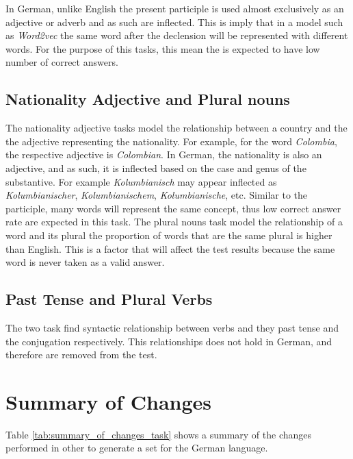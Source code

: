 In German, unlike English  the present participle is used almost exclusively as an
adjective or adverb and as such are inflected. This is imply that in a model
such as  \textit{Word2vec} the same word after the declension will be
represented with different words. For the purpose of this tasks, this mean
the is expected to have low number of correct answers.

\subsection{Nationality Adjective and  Plural nouns}
\label{sec:sub_sec_nat_plu}

The nationality adjective tasks model the relationship between a country and
the the adjective representing the nationality. For example, for the word
\textit{Colombia}, the respective adjective is \textit{Colombian}. In German,
the nationality is also an adjective, and as such, it  is inflected based on the
case and genus of the substantive.  For example  \textit{Kolumbianisch} may appear 
inflected as \textit{Kolumbianischer},  \textit{Kolumbianischem},
\textit{Kolumbianische}, etc.  Similar to the participle, many words will
represent the same concept, thus low correct answer rate are expected in this
task.  
The plural nouns task model the relationship of a word and its plural the
proportion of words that are the same plural is higher than English. This is
a factor that will affect the test results because the same word is never taken as a
valid answer. 


\subsection{Past Tense and Plural Verbs}
\label{sec:sub_sec_plural_verbs}
The two task find syntactic relationship between verbs and they past tense
and the conjugation respectively. This relationships does not hold in German,
and therefore are removed from the test.

\section{Summary of Changes} 
Table \ref{tab:summary_of_changes_task} shows a summary of the changes
performed in other to generate a set for the German language.


